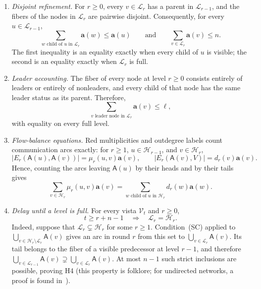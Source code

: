 \documentclass[11pt]{article}
\newcommand{\anon}{\mathbf a}
\newcommand{\agents}{\mathsf A}
\begin{document}
\begin{enumerate}[label=\textup{H\arabic*.},wide=0pt]
\item \emph{Disjoint refinement.}
      For \(r\geq0\), every \(v\in\mathcal L_r\) has a parent in
      \(\mathcal L_{r-1}\), and the fibers of the nodes in \(\mathcal L_r\) are pairwise
      disjoint. Consequently, for every
      \(u\in\mathcal L_{r-1}\),
      \[
       \sum_{w\text{ child of }u\text{ in }\mathcal L_r}\anon(w)\leq \anon(u)
       \qquad\text{and}\qquad
       \sum_{v\in\mathcal L_r}\anon(v)\leq n.
      \tag{H1}
      \]
      The first inequality is an equality exactly when every child of \(u\) is visible;
      the second is an equality exactly when \(\mathcal L_r\) is full.

\item \emph{Leader accounting.}
      The fiber of every node at level \(r\geq0\) consists entirely of leaders or entirely
      of nonleaders, and every child of that node has
      the same leader status as its parent.
      Therefore,
      \[
       \sum_{v\text{ leader node in }\mathcal L_r}\anon(v)
       \leq\ell,
      \tag{H2}
      \]
      with equality on every full level.

\item \emph{Flow-balance equations.}
      Red multiplicities and outdegree labels count communication arcs exactly:
      for \(r\geq1\), \(u\in\mathcal H_{r-1}\), and
      \(v\in\mathcal H_r\),
      \[
       |E_r(\agents(u),\agents(v))|
          =\mu_r(u,v)\anon(v),
       \qquad
       |E_r(\agents(v),V)|
          =d_r(v)\anon(v).
      \tag{H3}
      \]
      Hence, counting the arcs leaving \(\agents(u)\) by their heads and by their tails gives
      \[
       \sum_{v\in\mathcal H_r}\mu_r(u,v)\anon(v)
       =
       \sum_{w\text{ child of }u\text{ in }\mathcal H_r}
       d_r(w)\anon(w).
      \tag{Flow}
      \label{eq:flow}
      \]

\item \emph{Delay until a level is full.}
      For every vista \(\mathcal V_t\) and \(r\geq0\),
      \[
       t\geq r+n-1 \quad\Longrightarrow\quad
       \mathcal L_r=\mathcal H_r.
      \tag{H4}
      \]
      Indeed, suppose that
      \(\mathcal L_r\subsetneq\mathcal H_r\) for some \(r\geq1\).
      Condition~\textup{(SC)} applied to
      \(\bigcup_{v\in\mathcal H_r\setminus\mathcal L_r}\agents(v)\)
      gives an arc in round \(r\) from this set to
      \(\bigcup_{v\in\mathcal L_r}\agents(v)\).  Its tail belongs to the fiber of a visible
      predecessor at level \(r-1\), and therefore
      \(\bigcup_{v\in\mathcal L_{r-1}}\agents(v)
      \supsetneq\bigcup_{v\in\mathcal L_r}\agents(v)\).  At most
      \(n-1\) such strict inclusions are possible, proving H4 (this property is folklore; for undirected networks, a proof is found in~\cite[Corollary~4.3]{DV22}).
\end{enumerate}
\end{document}
